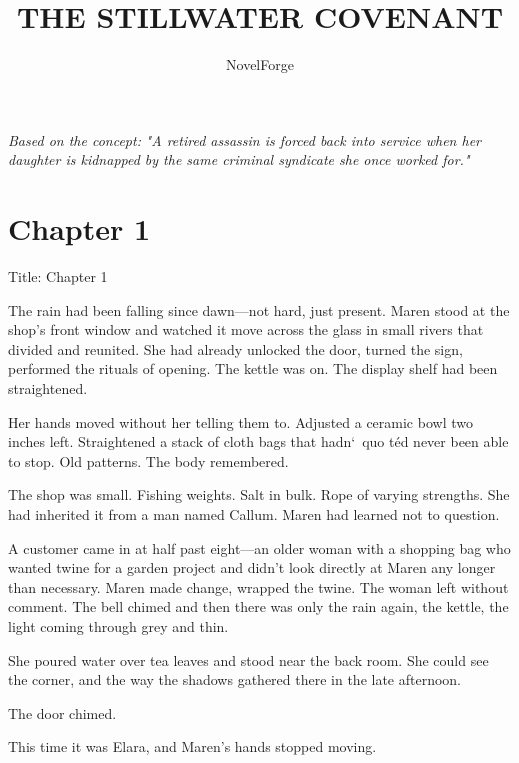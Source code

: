 \documentclass[12pt,letterpaper,openany]{book}
\begin{document}
\title{THE STILLWATER COVENANT}
\author{NovelForge}
\date{}

\maketitle
\thispagestyle{empty}
\newpage

\tableofcontents
\newpage


\newpage
\thispagestyle{empty}
\vfill
\begin{center}
\textit{Based on the concept:}
\textit{"A retired assassin is forced back into service when her daughter is kidnapped by the same criminal syndicate she once worked for."}
\end{center}
\vfill
\newpage



\chapter{Chapter 1}
Title: Chapter 1
\par
The rain had been falling since dawn—not hard, just present. Maren stood at the shop's front window and watched it move across the glass in small rivers that divided and reunited. She had already unlocked the door, turned the sign, performed the rituals of opening. The kettle was on. The display shelf had been straightened.
\par
Her hands moved without her telling them to. Adjusted a ceramic bowl two inches left. Straightened a stack of cloth bags that hadn`\ quo t\'e{}d never been able to stop. Old patterns. The body remembered.
\par
The shop was small. Fishing weights. Salt in bulk. Rope of varying strengths. She had inherited it from a man named Callum. Maren had learned not to question.
\par
A customer came in at half past eight—an older woman with a shopping bag who wanted twine for a garden project and didn't look directly at Maren any longer than necessary. Maren made change, wrapped the twine. The woman left without comment. The bell chimed and then there was only the rain again, the kettle, the light coming through grey and thin.
\par
She poured water over tea leaves and stood near the back room. She could see the corner, and the way the shadows gathered there in the late afternoon.
\par
The door chimed.
\par
This time it was Elara, and Maren's hands stopped moving.
\end{document}

